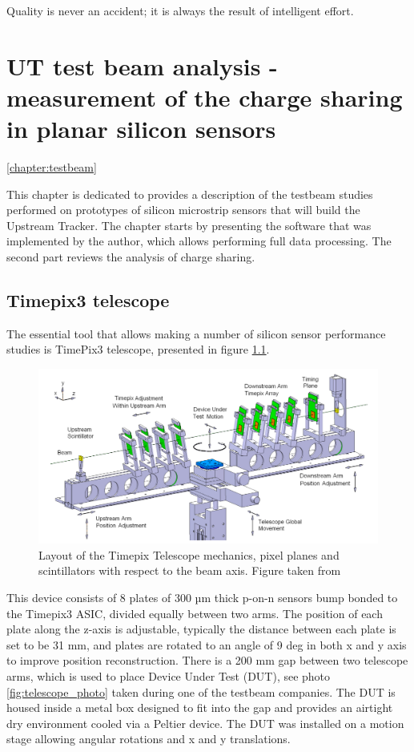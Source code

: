 \begin{savequote}[75mm] 
Quality is never an accident; it is always the result of intelligent effort. 
\end{savequote}


\chapter{UT test beam analysis - measurement of the charge sharing
in planar silicon sensors}
\ref{chapter:testbeam}

This chapter is dedicated to provides a description of the testbeam studies performed on prototypes of silicon microstrip sensors that will build the Upstream Tracker. The chapter starts by presenting the software that was implemented by the author, which allows performing full data processing. The second part reviews the analysis of charge sharing. 





\section{Timepix3 telescope}
The essential tool that allows making a number of silicon sensor performance studies is TimePix3 telescope, presented in figure \ref{fig:telescope}. 


\begin{figure}[!h]
\centering
\includegraphics{figures/telescope.png}
\caption{Layout of the Timepix Telescope mechanics, pixel planes and scintillators with respect to the beam axis. Figure taken from \cite{telescope}}
\label{fig:telescope}
\end{figure}


This device consists of 8 plates of 300 µm thick p-on-n sensors bump bonded to the Timepix3 ASIC, divided equally between two arms. The position of each plate along the z-axis is adjustable, typically the distance between each plate is set to be 31 mm, and plates are rotated to an angle of 9 deg in both x and y axis to improve position reconstruction. There is a 200 mm gap between two telescope arms, which is used to place Device Under Test (DUT), see photo \ref{fig:telescope_photo} taken during one of the testbeam companies. The DUT is housed inside a metal box designed to fit into the gap and provides an airtight dry environment cooled via a Peltier device. 
The DUT was installed on a motion stage allowing angular rotations and x and y translations. 

